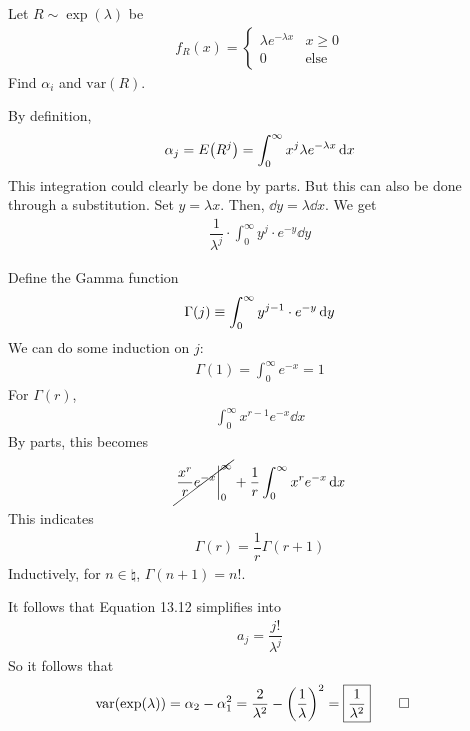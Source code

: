 \begin{example}
    Let $R \sim \exp(\lambda)$ be
    \begin{align}
        f_R(x) = \begin{cases}
            \lambda e^{-\lambda x} & x \ge 0\\
            0 & \text{else}
        \end{cases}
    \end{align}
    Find $\alpha_i$ and $\text{var}(R)$.
\end{example}
\begin{solution}
    By definition,
    \begin{align}
        \alpha_j = E\qty(R^j) = \int_0^\infty x^j \lambda e^{-\lambda x} \dd{x}
    \end{align}
    This integration could clearly be done by parts. But this can also be done through a substitution. Set $y = \lambda x$. Then, $\dd{y} = \lambda \dd{x}$. We get
    \begin{align}
        \dfrac{1}{\lambda^j} \cdot \int_0^\infty y^j \cdot e^{-y} \dd{y}
    \end{align}
    \begin{aside}
        Define the Gamma function
        \begin{align}
            \Gamma\qty(j) \equiv \int_0^\infty y^{j-1} \cdot e^{-y} \dd{y}
        \end{align}
        We can do some induction on $j$:
        \begin{align}
            \Gamma(1) = \int_0^\infty e^{-x} = 1
        \end{align}
        For $\Gamma(r)$,
        \begin{align}
            \int_0^\infty x^{r-1} e^{-x} \dd{x}
        \end{align}
        By parts, this becomes
        \begin{align}
            \cancel{\eval{\frac{x^r}{r} e^{-x}}_0^\infty} + \frac{1}{r} \int_0^\infty x^r e^{-x} \dd{x}
        \end{align}
        This indicates
        \begin{align}
            \Gamma(r) = \dfrac{1}{r} \Gamma(r+1)
        \end{align}
        Inductively, for $n \in \natural$, $\Gamma(n + 1) = n!$.
    \end{aside}
    It follows that Equation 13.12 simplifies into
    \begin{align}
        a_j = \dfrac{j!}{\lambda^j}
    \end{align}
    So it follows that
    \begin{align}
        \text{var}\qty(\exp(\lambda)) = \alpha_2 - \alpha_1^2 = \dfrac{2}{\lambda^2} - \qty(\dfrac{1}{\lambda})^2 = \boxed{\dfrac{1}{\lambda^2}} & \qedhere
    \end{align}
\end{solution}

